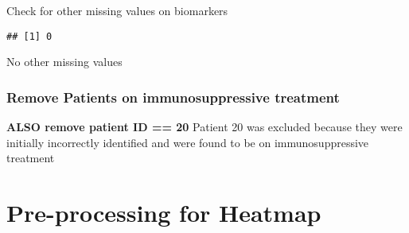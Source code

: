 \documentclass[]{article}
\newenvironment{Shaded}{\begin{snugshade}}{\end{snugshade}}
\newcommand{\KeywordTok}[1]{\textcolor[rgb]{0.13,0.29,0.53}{\textbf{{#1}}}}
\newcommand{\DecValTok}[1]{\textcolor[rgb]{0.00,0.00,0.81}{{#1}}}
\newcommand{\StringTok}[1]{\textcolor[rgb]{0.31,0.60,0.02}{{#1}}}
\newcommand{\CommentTok}[1]{\textcolor[rgb]{0.56,0.35,0.01}{\textit{{#1}}}}
\newcommand{\NormalTok}[1]{{#1}}
\begin{document}
\begin{Shaded}
\end{Shaded}

Check for other missing values on biomarkers

\begin{Shaded}
\end{Shaded}

\begin{verbatim}
## [1] 0
\end{verbatim}

No other missing values

\subsubsection{Remove Patients on immunosuppressive
treatment}\label{remove-patients-on-immunosuppressive-treatment}

\textbf{ALSO remove patient ID == 20} Patient 20 was excluded because
they were initially incorrectly identified and were found to be on
immunosuppressive treatment

\begin{Shaded}
\end{Shaded}

\section{Pre-processing for Heatmap}\label{pre-processing-for-heatmap}
\end{document}
